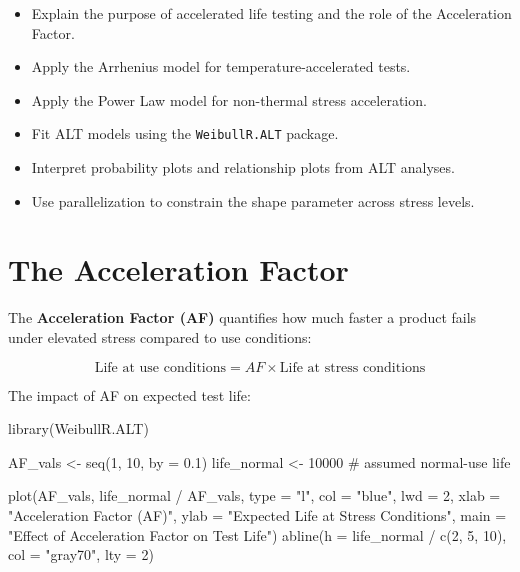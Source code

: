 \documentclass[
  letterpaper,
  DIV=11,
  numbers=noendperiod]{scrreprt}
\newenvironment{Shaded}{\begin{snugshade}}{\end{snugshade}}
\newcommand{\AttributeTok}[1]{\textcolor[rgb]{0.40,0.45,0.13}{#1}}
\newcommand{\CommentTok}[1]{\textcolor[rgb]{0.37,0.37,0.37}{#1}}
\newcommand{\DecValTok}[1]{\textcolor[rgb]{0.68,0.00,0.00}{#1}}
\newcommand{\FloatTok}[1]{\textcolor[rgb]{0.68,0.00,0.00}{#1}}
\newcommand{\FunctionTok}[1]{\textcolor[rgb]{0.28,0.35,0.67}{#1}}
\newcommand{\NormalTok}[1]{\textcolor[rgb]{0.00,0.23,0.31}{#1}}
\newcommand{\OtherTok}[1]{\textcolor[rgb]{0.00,0.23,0.31}{#1}}
\newcommand{\SpecialCharTok}[1]{\textcolor[rgb]{0.37,0.37,0.37}{#1}}
\newcommand{\StringTok}[1]{\textcolor[rgb]{0.13,0.47,0.30}{#1}}
\providecommand{\tightlist}{%
  \setlength{\itemsep}{0pt}\setlength{\parskip}{0pt}}
\begin{document}
\begin{itemize}
\tightlist
\item
  Explain the purpose of accelerated life testing and the role of the
  Acceleration Factor.
\item
  Apply the Arrhenius model for temperature-accelerated tests.
\item
  Apply the Power Law model for non-thermal stress acceleration.
\item
  Fit ALT models using the \texttt{WeibullR.ALT} package.
\item
  Interpret probability plots and relationship plots from ALT analyses.
\item
  Use parallelization to constrain the shape parameter across stress
  levels.
\end{itemize}

\section{The Acceleration Factor}\label{the-acceleration-factor}

The \textbf{Acceleration Factor (AF)} quantifies how much faster a
product fails under elevated stress compared to use conditions:

\[\text{Life at use conditions} = AF \times \text{Life at stress conditions}\]

The impact of AF on expected test life:

\begin{Shaded}
\begin{Highlighting}[]
\FunctionTok{library}\NormalTok{(WeibullR.ALT)}
\end{Highlighting}
\end{Shaded}

\begin{Shaded}
\begin{Highlighting}[]
\NormalTok{AF\_vals }\OtherTok{\textless{}{-}} \FunctionTok{seq}\NormalTok{(}\DecValTok{1}\NormalTok{, }\DecValTok{10}\NormalTok{, }\AttributeTok{by =} \FloatTok{0.1}\NormalTok{)}
\NormalTok{life\_normal }\OtherTok{\textless{}{-}} \DecValTok{10000}  \CommentTok{\# assumed normal{-}use life}

\FunctionTok{plot}\NormalTok{(AF\_vals, life\_normal }\SpecialCharTok{/}\NormalTok{ AF\_vals, }\AttributeTok{type =} \StringTok{"l"}\NormalTok{, }\AttributeTok{col =} \StringTok{"blue"}\NormalTok{, }\AttributeTok{lwd =} \DecValTok{2}\NormalTok{,}
     \AttributeTok{xlab =} \StringTok{"Acceleration Factor (AF)"}\NormalTok{,}
     \AttributeTok{ylab =} \StringTok{"Expected Life at Stress Conditions"}\NormalTok{,}
     \AttributeTok{main =} \StringTok{"Effect of Acceleration Factor on Test Life"}\NormalTok{)}
\FunctionTok{abline}\NormalTok{(}\AttributeTok{h =}\NormalTok{ life\_normal }\SpecialCharTok{/} \FunctionTok{c}\NormalTok{(}\DecValTok{2}\NormalTok{, }\DecValTok{5}\NormalTok{, }\DecValTok{10}\NormalTok{), }\AttributeTok{col =} \StringTok{"gray70"}\NormalTok{, }\AttributeTok{lty =} \DecValTok{2}\NormalTok{)}
\end{Highlighting}
\end{Shaded}
\end{document}
